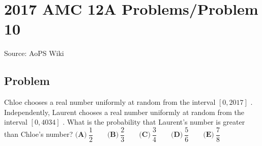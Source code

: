\documentclass[12pt]{article}
\begin{document}
\section*{{2017 AMC 12A Problems/Problem 10}}
Source: AoPS Wiki

\subsection*{Problem}
Chloe chooses a real number uniformly at random from the interval $[ 0,2017 ]$ . Independently, Laurent chooses a real number uniformly at random from the interval $[ 0 , 4034 ]$ . What is the probability that Laurent's number is greater than Chloe's number? $\textbf{(A)}\ \dfrac{1}{2} \qquad\textbf{(B)}\ \dfrac{2}{3} \qquad\textbf{(C)}\ \dfrac{3}{4} \qquad\textbf{(D)}\ \dfrac{5}{6} \qquad\textbf{(E)}\ \dfrac{7}{8}$
\end{document}
